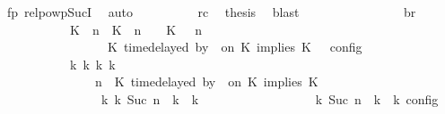 \begin{isabellebody}
\ fp\ relpowp{\isacharunderscore}Suc{\isacharunderscore}I{}\ \isamarkupfalse%
\ auto\isanewline
\ \ \ \ \ \ \ \ \isamarkupfalse%
\ rc\ \isamarkupfalse%
\ {\isacharquery}thesis\ \isamarkupfalse%
\ blast\isanewline
\ \ \ \ \ \ \isamarkupfalse%
\isanewline
\ \ \ \ \ \ \isamarkupfalse%
\ \isamarkupfalse%
\ br{}{\isacharcolon}\isanewline
\ \ \ \ \ \ \ \ {\isacartoucheopen}{\isasymrho}\ {\isasymin}\ {\isasymlbrakk}\ {\isacharparenleft}{\isacharparenleft}K\ {\isasymUp}\ n{\isacharparenright}\ {\isacharhash}\ {\isacharparenleft}K\ {\isacharat}\ n\ {\isasymoplus}\ {\isasymdelta}{\isasymtau}\ {\isasymRightarrow}\ K\ {\isacharhash}\ {\isasymGamma}{\isacharparenright}{\isacharcomma}\ n\isanewline
\ \ \ \ \ \ \ \ \ \ \ \ \ \ {\isasymturnstile}\ {\isasymPsi}\ {\isasymtriangleright}\ {\isacharparenleft}{\isacharparenleft}K\ time{\isacharminus}delayed\ by\ {\isasymdelta}{\isasymtau}\ on\ K\ implies\ K\ {\isacharhash}\ {\isasymPhi}{\isacharparenright}\ {\isasymrbrakk}\isactrlsub c\isactrlsub o\isactrlsub n\isactrlsub f\isactrlsub i\isactrlsub g\isanewline
\ \ \ \ \ \ \ \ \ \ {\isasymLongrightarrow}\ {\isasymexists}{\isasymGamma}\isactrlsub k\ {\isasymPsi}\isactrlsub k\ {\isasymPhi}\isactrlsub k\ k{\isachardot}\isanewline
\ \ \ \ \ \ \ \ \ \ \ \ \ \ {\isacharparenleft}{\isacharparenleft}{\isasymGamma}{\isacharcomma}\ n\ {\isasymturnstile}\ {\isacharparenleft}{\isacharparenleft}K\ time{\isacharminus}delayed\ by\ {\isasymdelta}{\isasymtau}\ on\ K\ implies\ K\ {\isacharhash}\ {\isasymPsi}{\isacharparenright}\ {\isasymtriangleright}\ {\isasymPhi}{\isacharparenright}\isanewline
\ \ \ \ \ \ \ \ \ \ \ \ \ \ \ \ {\isasymhookrightarrow}\isactrlbsup k\isactrlesup \ {\isacharparenleft}{\isasymGamma}\isactrlsub k{\isacharcomma}\ Suc\ n\ {\isasymturnstile}\ {\isasymPsi}\isactrlsub k\ {\isasymtriangleright}\ {\isasymPhi}\isactrlsub k{\isacharparenright}{\isacharparenright}\isanewline
\ \ \ \ \ \ \ \ \ \ \ \ \ \ {\isasymand}\ {\isasymrho}\ {\isasymin}\ {\isasymlbrakk}\ {\isasymGamma}\isactrlsub k{\isacharcomma}\ Suc\ n\ {\isasymturnstile}\ {\isasymPsi}\isactrlsub k\ {\isasymtriangleright}\ {\isasymPhi}\isactrlsub k\ {\isasymrbrakk}\isactrlsub c\isactrlsub o\isactrlsub n\isactrlsub f\isactrlsub i\isactrlsub g{\isacartoucheclose}\isanewline

\end{isabellebody}
